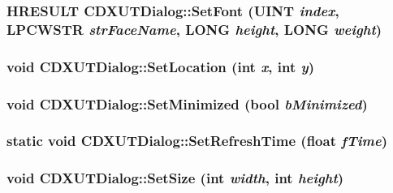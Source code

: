 \label{class_c_d_x_u_t_dialog_ad509ffcb58000556545e337cbba2e656}
\hypertarget{class_c_d_x_u_t_dialog_a04466dc5ca32546b327aa76e1b57d970}{
\subsubsection[{SetFont}]{\setlength{\rightskip}{0pt plus 5cm}HRESULT CDXUTDialog::SetFont (UINT {\em index}, \/  LPCWSTR {\em strFaceName}, \/  LONG {\em height}, \/  LONG {\em weight})}}
\label{class_c_d_x_u_t_dialog_a04466dc5ca32546b327aa76e1b57d970}
\hypertarget{class_c_d_x_u_t_dialog_af42fdc0cacf7eef44dc518f0cc9903c5}{
\subsubsection[{SetLocation}]{\setlength{\rightskip}{0pt plus 5cm}void CDXUTDialog::SetLocation ({\bf int} {\em x}, \/  {\bf int} {\em y})}}
\label{class_c_d_x_u_t_dialog_af42fdc0cacf7eef44dc518f0cc9903c5}
\hypertarget{class_c_d_x_u_t_dialog_a464452e6d763a09a896a5f51c20e8011}{
\subsubsection[{SetMinimized}]{\setlength{\rightskip}{0pt plus 5cm}void CDXUTDialog::SetMinimized (bool {\em bMinimized})}}
\label{class_c_d_x_u_t_dialog_a464452e6d763a09a896a5f51c20e8011}
\hypertarget{class_c_d_x_u_t_dialog_a8da046bceb25136e8c34a2553e517097}{
\subsubsection[{SetRefreshTime}]{\setlength{\rightskip}{0pt plus 5cm}static void CDXUTDialog::SetRefreshTime (float {\em fTime})}}
\label{class_c_d_x_u_t_dialog_a8da046bceb25136e8c34a2553e517097}
\hypertarget{class_c_d_x_u_t_dialog_adb63ce7dfbc73250cf7ecd45b424ab96}{
\subsubsection[{SetSize}]{\setlength{\rightskip}{0pt plus 5cm}void CDXUTDialog::SetSize ({\bf int} {\em width}, \/  {\bf int} {\em height})}}
